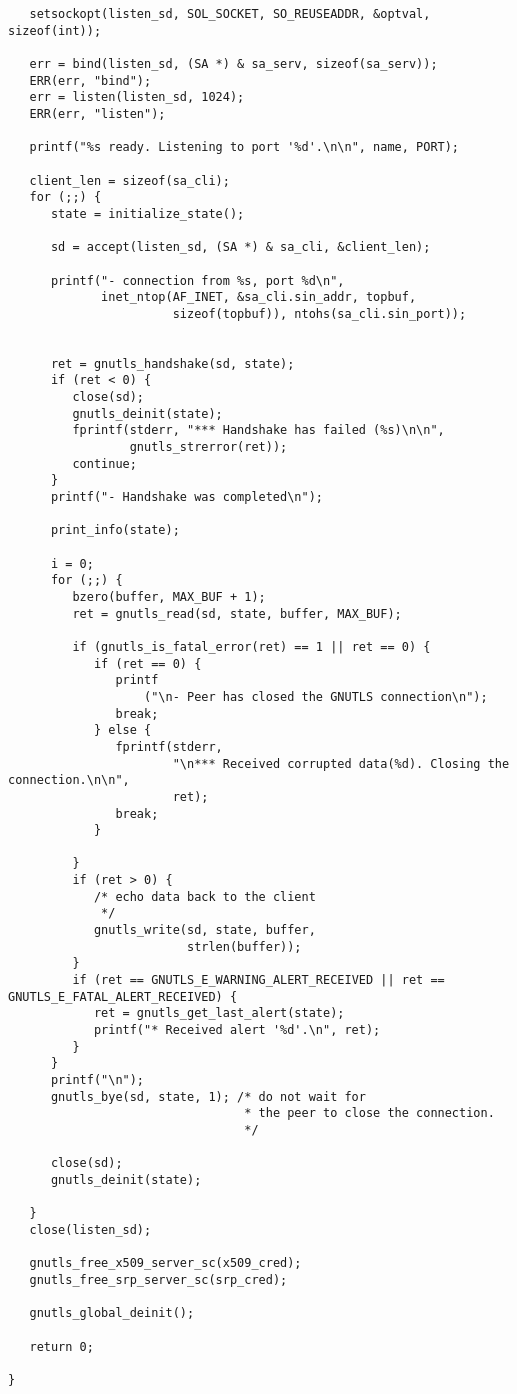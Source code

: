 \begin{verbatim}
   setsockopt(listen_sd, SOL_SOCKET, SO_REUSEADDR, &optval, sizeof(int));

   err = bind(listen_sd, (SA *) & sa_serv, sizeof(sa_serv));
   ERR(err, "bind");
   err = listen(listen_sd, 1024);
   ERR(err, "listen");

   printf("%s ready. Listening to port '%d'.\n\n", name, PORT);

   client_len = sizeof(sa_cli);
   for (;;) {
      state = initialize_state();

      sd = accept(listen_sd, (SA *) & sa_cli, &client_len);

      printf("- connection from %s, port %d\n",
             inet_ntop(AF_INET, &sa_cli.sin_addr, topbuf,
                       sizeof(topbuf)), ntohs(sa_cli.sin_port));


      ret = gnutls_handshake(sd, state);
      if (ret < 0) {
         close(sd);
         gnutls_deinit(state);
         fprintf(stderr, "*** Handshake has failed (%s)\n\n",
                 gnutls_strerror(ret));
         continue;
      }
      printf("- Handshake was completed\n");

      print_info(state);

      i = 0;
      for (;;) {
         bzero(buffer, MAX_BUF + 1);
         ret = gnutls_read(sd, state, buffer, MAX_BUF);

         if (gnutls_is_fatal_error(ret) == 1 || ret == 0) {
            if (ret == 0) {
               printf
                   ("\n- Peer has closed the GNUTLS connection\n");
               break;
            } else {
               fprintf(stderr,
                       "\n*** Received corrupted data(%d). Closing the connection.\n\n",
                       ret);
               break;
            }

         }
         if (ret > 0) {
            /* echo data back to the client
             */
            gnutls_write(sd, state, buffer,
                         strlen(buffer));
         }
         if (ret == GNUTLS_E_WARNING_ALERT_RECEIVED || ret == GNUTLS_E_FATAL_ALERT_RECEIVED) {
            ret = gnutls_get_last_alert(state);
            printf("* Received alert '%d'.\n", ret);
         }
      }
      printf("\n");
      gnutls_bye(sd, state, 1); /* do not wait for
                                 * the peer to close the connection.
                                 */

      close(sd);
      gnutls_deinit(state);

   }
   close(listen_sd);

   gnutls_free_x509_server_sc(x509_cred);
   gnutls_free_srp_server_sc(srp_cred);

   gnutls_global_deinit();

   return 0;

}

\end{verbatim}
